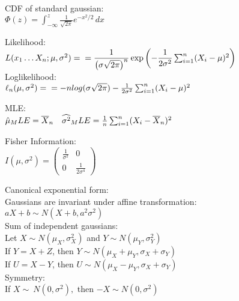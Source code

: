CDF of standard gaussian:\\

$\Phi (z) = \int _{-\infty }^ z \frac{1}{\sqrt{2 \pi }} e^{-x^2/2} \,  dx$

Likelihood:\\

$L(x_1\dots X_n;\mu,\sigma^2)=\\ 
= \dfrac{1}{\left(\sigma\sqrt{2\pi}\right)^n}\exp{\left(-\dfrac{1}{2\sigma^2}\sum_{i=1}^n (X_i-\mu)^2 \right)}$\\

Loglikelihood:\\

$\ell_n (\mu,\sigma^2)= \\
= -n log(\sigma\sqrt{2\pi})-\frac{1}{2\sigma^2}\sum_{i=1}^n (X_i-\mu)^2 $

MLE:\\

$\hat\mu_MLE = \bar X_ n\\
\quad \widehat{\sigma ^2}_MLE = \frac{1}{n} \sum _{i=1}^{n} (X_ i - \bar X_ n)^2$

Fisher Information:\\

$I(\mu , \sigma ^2) = \begin{pmatrix}  \frac{1}{\sigma ^2} &  0 \\ 0 &  \frac{1}{2 \sigma ^4} \end{pmatrix}$

Canonical exponential form:\\

Gaussians are invariant under affine transformation:\\

$aX+b \sim N(X+b,a^2\sigma^2)$\\

Sum of independent gaussians:\\

Let $X {\sim} N(\mu_X,\sigma_X^2)$ and $Y {\sim} N(\mu_Y,\sigma_Y^2)$\\

If $Y = X + Z$, then $Y \sim N(\mu_X + \mu_Y, \sigma_X + \sigma_Y)$\\

If $U = X - Y$, then $U \sim N(\mu_X - \mu_Y,\sigma_X + \sigma_Y)$\\

Symmetry:\\

If $X \sim\ N(0,\sigma^2),$ then $-X \sim N(0,\sigma^2)$\\

